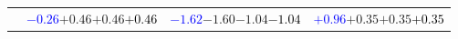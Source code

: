 \documentclass[compress]{beamer}
\begin{document}
\begin{frame}
\begin{tabular}{r | c | c | c}
          & \textcolor{blue}{$-0.26$}\hspace{0.1 cm}$+0.46$\hspace{0.1 cm}$+0.46$\hspace{0.1 cm}\textcolor{black}{$+0.46$} & \textcolor{blue}{$-1.62$}\hspace{0.1 cm}$-1.60$\hspace{0.1 cm}$-1.04$\hspace{0.1 cm}\textcolor{black}{$-1.04$} & \textcolor{blue}{$+0.96$}\hspace{0.1 cm}$+0.35$\hspace{0.1 cm}$+0.35$\hspace{0.1 cm}\textcolor{black}{$+0.35$} \\
\end{tabular}
\end{frame}
\end{document}
